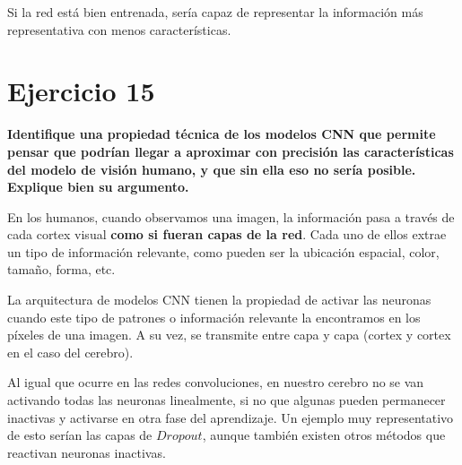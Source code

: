 \documentclass[11pt,a4paper]{article}
\begin{document}
Si la red está bien entrenada, sería capaz de representar la información más representativa con menos características.


\section*{Ejercicio 15}

\textbf{Identifique una propiedad técnica de los modelos CNN que permite pensar que podrían llegar a aproximar con precisión las características del modelo de visión
humano, y que sin ella eso no sería posible. Explique bien su argumento.}

En los humanos, cuando observamos una imagen, la información pasa a través de cada cortex visual \textbf{como si fueran capas de la red}. Cada uno de ellos extrae un tipo
de información relevante, como pueden ser la ubicación espacial, color, tamaño, forma, etc.

La arquitectura de modelos CNN tienen la propiedad de activar las neuronas cuando este tipo de patrones o información relevante la encontramos en los píxeles de una imagen.
A su vez, se transmite entre capa y capa (cortex y cortex en el caso del cerebro).

Al igual que ocurre en las redes convoluciones, en nuestro cerebro no se van activando todas las neuronas linealmente, si no que algunas pueden permanecer inactivas y activarse
en otra fase del aprendizaje. Un ejemplo muy representativo de esto serían las capas de $Dropout$, aunque también existen otros métodos que reactivan neuronas inactivas.
\end{document}
